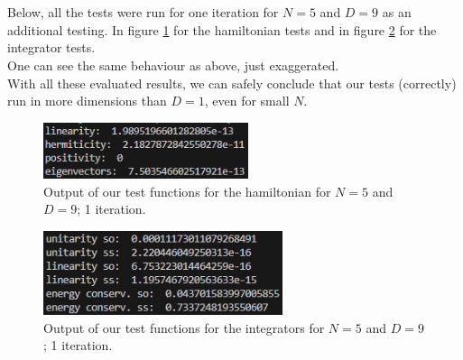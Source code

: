 \documentclass[11pt, letterpaper, onecolumn]{article}
\begin{document}
	\\
	\\
	Below, all the tests were run for one iteration for $N=5$ and $D=9$ as an additional testing. In figure \ref{fig:test-hamiltonian-9D} for the hamiltonian tests and in figure \ref{fig:test-integrators-9D} for the integrator tests.\\
    One can see the same behaviour as above, just exaggerated. \\
	With all these evaluated results, we can safely conclude that our tests (correctly) run in more dimensions than $D=1$, even for small $N$.
	\begin{figure} [H] 
	\begin{center}
	\includegraphics[width=6cm]{"test_hamiltonian-9D2.png"}
	\caption{Output of our test functions for the hamiltonian for $N=5$ and $D=9$; 1 iteration.} \label{fig:test-hamiltonian-9D}
	\end{center}
	\end{figure}
	\begin{figure} [H] 
	\begin{center}
	\includegraphics[width=7cm]{"test_integrators-9D2.png"}
	\caption{Output of our test functions for the integrators for $N=5$ and $D=9$; 1 iteration.} \label{fig:test-integrators-9D}
	\end{center}
	\end{figure}
	
	
	
	
	
	
	
\end{document}
